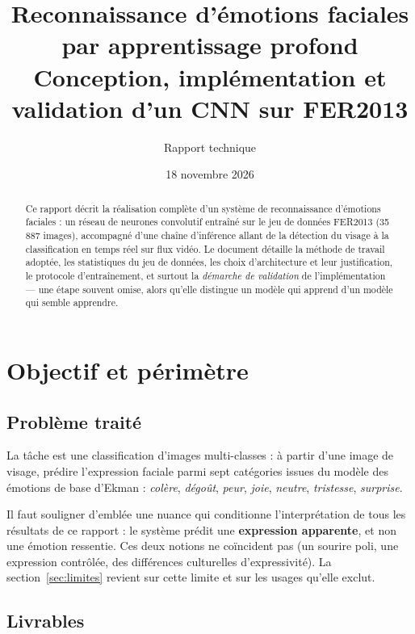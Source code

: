 \documentclass[11pt,a4paper]{article}
\title{\vspace{-1.2cm}\textbf{Reconnaissance d'émotions faciales par apprentissage profond}\\[2mm]
\large Conception, implémentation et validation d'un CNN sur FER2013}
\author{Rapport technique}
\date{18 novembre 2026}
\begin{document}
\maketitle
\thispagestyle{fancy}

\begin{abstract}
\noindent
Ce rapport décrit la réalisation complète d'un système de reconnaissance
d'émotions faciales : un réseau de neurones convolutif entraîné sur le jeu de
données FER2013 (35\,887 images), accompagné d'une chaîne d'inférence allant de
la détection du visage à la classification en temps réel sur flux vidéo. Le
document détaille la méthode de travail adoptée, les statistiques du jeu de
données, les choix d'architecture et leur justification, le protocole
d'entraînement, et surtout la \emph{démarche de validation} de l'implémentation
--- une étape souvent omise, alors qu'elle distingue un modèle qui apprend d'un
modèle qui semble apprendre.
\end{abstract}

\tableofcontents
\vspace{4mm}

\section{Objectif et périmètre}

\subsection{Problème traité}

La tâche est une classification d'images multi-classes : à partir d'une image de
visage, prédire l'expression faciale parmi sept catégories issues du modèle des
émotions de base d'Ekman : \emph{colère}, \emph{dégoût}, \emph{peur},
\emph{joie}, \emph{neutre}, \emph{tristesse}, \emph{surprise}.

Il faut souligner d'emblée une nuance qui conditionne l'interprétation de tous
les résultats de ce rapport : le système prédit une \textbf{expression
apparente}, et non une émotion ressentie. Ces deux notions ne coïncident pas
(un sourire poli, une expression contrôlée, des différences culturelles
d'expressivité). La section~\ref{sec:limites} revient sur cette limite et sur
les usages qu'elle exclut.

\subsection{Livrables}
\end{document}

